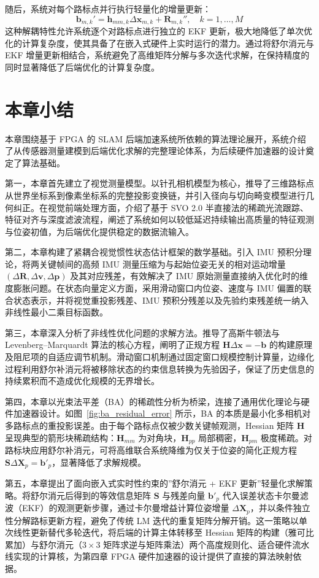 随后，系统对每个路标点并行执行轻量化的增量更新：
\begin{equation}
\mathbf{b}_{m,k}' = \mathbf{h}_{mm,k} \Delta \mathbf{x}_{m,k} + \mathbf{R}_{m,k}'', \quad k=1, \dots, M
\end{equation}
这种解耦特性允许系统逐个对路标点进行独立的 EKF 更新，极大地降低了单次优化的计算复杂度，使其具备了在嵌入式硬件上实时运行的潜力。通过将舒尔消元与 EKF 增量更新相结合，系统避免了高维矩阵分解与多次迭代求解，在保持精度的同时显著降低了后端优化的计算复杂度。


\section{本章小结}

本章围绕基于 FPGA 的 SLAM 后端加速系统所依赖的算法理论展开，系统介绍了从传感器测量建模到后端优化求解的完整理论体系，为后续硬件加速器的设计奠定了算法基础。

第一，本章首先建立了视觉测量模型。以针孔相机模型为核心，推导了三维路标点从世界坐标系到像素坐标系的完整投影变换链，并引入径向与切向畸变模型进行几何纠正。在视觉前端处理方面，介绍了基于 SVO 2.0 半直接法的稀疏光流跟踪、特征对齐与深度滤波流程，阐述了系统如何以较低延迟持续输出高质量的特征观测与位姿初值，为后端优化提供稳定的数据流输入。

第二，本章构建了紧耦合视觉惯性状态估计框架的数学基础。引入 IMU 预积分理论，将两关键帧间的高频 IMU 测量压缩为与起始位姿无关的相对运动增量 $(\Delta\mathbf{R}, \Delta\mathbf{v}, \Delta\mathbf{p})$ 及其对应残差，有效解决了 IMU 原始测量直接纳入优化时的维度膨胀问题。在状态向量定义方面，采用滑动窗口内位姿、速度与 IMU 偏置的联合状态表示，并将视觉重投影残差、IMU 预积分残差以及先验约束残差统一纳入非线性最小二乘目标函数。

第三，本章深入分析了非线性优化问题的求解方法。推导了高斯牛顿法与 Levenberg--Marquardt 算法的核心方程，阐明了正规方程 $\mathbf{H}\Delta\mathbf{x} = -\mathbf{b}$ 的构建原理及阻尼项的自适应调节机制。滑动窗口机制通过固定窗口规模控制计算量，边缘化过程利用舒尔补消元将被移除状态的约束信息转换为先验因子，保证了历史信息的持续累积而不造成优化规模的无界增长。

第四，本章以光束法平差（BA）的稀疏性分析为桥梁，连接了通用优化理论与硬件加速器设计。如图~\ref{fig:ba_residual_error} 所示，BA 的本质是最小化多相机对多路标点的重投影误差。由于每个路标点仅被少数关键帧观测，Hessian 矩阵 $\mathbf{H}$ 呈现典型的箭形块稀疏结构：$\mathbf{H}_{mm}$ 为对角块，$\mathbf{H}_{pp}$ 局部稠密，$\mathbf{H}_{pm}$ 极度稀疏。对路标块应用舒尔补消元，可将高维联合系统降维为仅关于位姿的简化正规方程 $\mathbf{S}\Delta\mathbf{X}_p = \mathbf{b}'_p$，显著降低了求解规模。

第五，本章提出了面向嵌入式实时性约束的”舒尔消元 + EKF 更新”轻量化求解策略。将舒尔消元后得到的等效信息矩阵 $\mathbf{S}$ 与残差向量 $\mathbf{b}'_p$ 代入误差状态卡尔曼滤波（EKF）的观测更新步骤，通过卡尔曼增益计算位姿增量 $\Delta\mathbf{X}_p$，并以条件独立性分解路标更新方程，避免了传统 LM 迭代的重复矩阵分解开销。这一策略以单次线性更新替代多轮迭代，将后端的计算主体转移至 Hessian 矩阵的构建（雅可比累加）与舒尔消元（$3\times3$ 矩阵求逆与矩阵乘法）两个高度规则化、适合硬件流水线实现的计算核，为第四章 FPGA 硬件加速器的设计提供了直接的算法映射依据。
